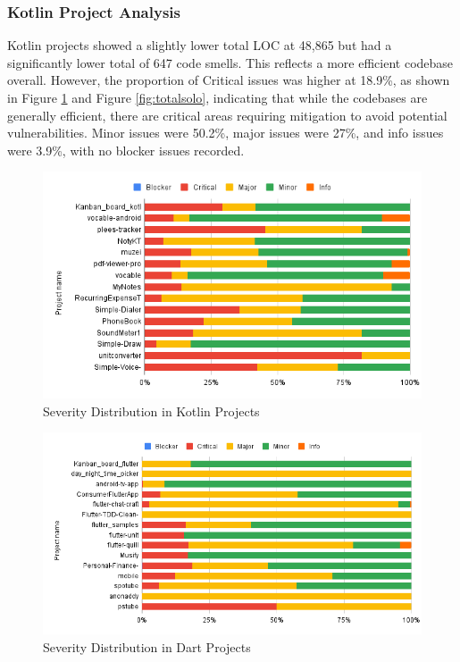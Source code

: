 \subsubsection{Kotlin Project Analysis}
Kotlin projects showed a slightly lower total LOC at 48,865 but had a significantly lower total of 647 code smells. This reflects a more efficient codebase overall. However, the proportion of Critical issues was higher at 18.9\%, as shown in Figure \ref*{fig:kotlinsolo} and Figure \ref*{fig:totalsolo}, indicating that while the codebases are generally efficient, there are critical areas requiring mitigation to avoid potential vulnerabilities. Minor issues were 50.2\%, major issues were 27\%, and info issues were 3.9\%, with no blocker issues recorded.


\begin{figure}[htbp]
    \centering
    \includegraphics[scale = 0.58]{img/KOTLINSOLO.png}
    \caption{Severity Distribution in Kotlin Projects}
    \label{fig:kotlinsolo}
\end{figure}

\begin{figure}[htbp]
    \centering
    \includegraphics[scale = 0.58]{img/FLUTTERSOLO.png}
    \caption{Severity Distribution in Dart Projects}
    \label{fig:dartsolo}
\end{figure}
